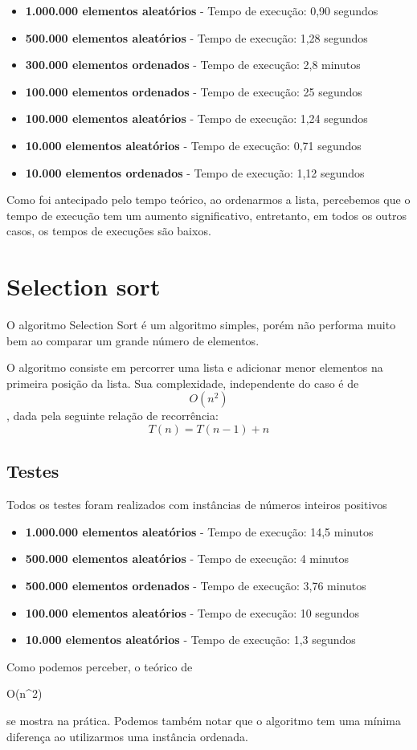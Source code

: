 \documentclass{article}
\begin{document}
\begin{itemize}
  \item \textbf{1.000.000 elementos aleatórios} - Tempo de execução: 0,90 segundos  
  \item \textbf{500.000 elementos aleatórios} - Tempo de execução: 1,28 segundos \item \textbf{300.000 elementos ordenados} - Tempo de execução: 2,8 minutos
  \item \textbf{100.000 elementos ordenados} - Tempo de execução: 25 segundos
  \item \textbf{100.000 elementos aleatórios} - Tempo de execução: 1,24 segundos
  \item \textbf{10.000 elementos aleatórios} - Tempo de execução: 0,71 segundos \item \textbf{10.000 elementos ordenados} - Tempo de execução: 1,12 segundos
\end{itemize}  

Como foi antecipado pelo tempo teórico, ao ordenarmos a lista, percebemos que o tempo de execução tem um aumento significativo, entretanto, em todos os outros casos, os tempos de execuções são baixos.

\section{Selection sort}

O algoritmo Selection Sort é um algoritmo simples, porém não performa muito bem ao comparar um grande número de elementos.

O algoritmo consiste em percorrer uma lista e adicionar menor elementos na primeira posição da lista. Sua complexidade, independente do caso é de \begin{displaymath}O(n^{2})\end{displaymath}, dada pela seguinte relação de recorrência:
\begin{displaymath} T(n)=T(n-1)+ n  \end{displaymath}

\subsection{Testes}

Todos os testes foram realizados com instâncias de números inteiros positivos


\begin{itemize}
  \item \textbf{1.000.000 elementos aleatórios} - Tempo de execução: 14,5 minutos  
  \item \textbf{500.000 elementos aleatórios} - Tempo de execução: 4 minutos  
  \item \textbf{500.000 elementos ordenados} - Tempo de execução: 3,76 minutos
  \item \textbf{100.000 elementos aleatórios} - Tempo de execução: 10 segundos
  \item \textbf{10.000 elementos aleatórios} - Tempo de execução: 1,3 segundos 
\end{itemize}  

Como podemos perceber, o teórico de \begin{displaystyle} O(n^{2}) \end{displaystyle} se mostra na prática. Podemos também notar que o algoritmo tem uma mínima diferença ao utilizarmos uma instância ordenada.
\end{document}
